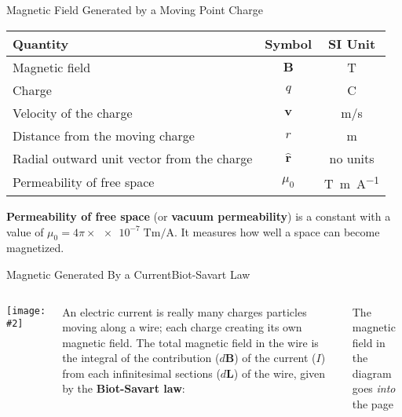 \documentclass[12pt,aspectratio=169]{beamer}
\newcommand{\pic}[2]{\texttt{[image: \#2]}}
\newcommand{\mb}[1]{\mathbf{#1}}
\newcommand{\eq}[2]{\vspace{#1}{\Large\begin{displaymath}#2\end{displaymath}}}
\begin{document}
\begin{frame}{Magnetic Field Generated by a Moving Point Charge}

  \eq{-.05in}{
    \boxed{\mb{B}=\frac{\mu_0}{4\pi}\frac{q\mb{v}\times\hat{\mb{r}}}{r^2}}
  }
  \begin{center}
    \begin{tabular}{l|c|c}
      \rowcolor{pink}
      \textbf{Quantity} & \textbf{Symbol} & \textbf{SI Unit} \\ \hline
      Magnetic field                  & $\mb{B}$ & \si{\tesla}\\
      Charge                          & $q$      & \si{\coulomb}\\
      Velocity of the charge          & $\mb{v}$ & \si{m/\second}\\
      Distance from the moving charge & $r$      & \si{\metre}\\
      Radial outward unit vector from the charge & $\hat{\mb{r}}$ & no units\\
      Permeability of free space & $\mu_0$ & \si{\tesla\metre\per\ampere}
    \end{tabular}
  \end{center}
  \textbf{Permeability of free space} (or \textbf{vacuum permeability}) is a
  constant with a value of
  $\mu_0=4\pi\times\num{e-7}\;\si{\tesla\metre\per\ampere}$. It measures how
  well a space can become magnetized.
\end{frame}



\begin{frame}{Magnetic Generated By a Current}{Biot-Savart Law}
  \begin{columns}
    \pic{1}{bsav.png}
    
    An electric current is really many charges particles moving along a wire;
    each charge creating its own magnetic field.
    The total magnetic field in the wire is the integral of the contribution
    ($d\mb{B}$) of the current ($I$) from each infinitesimal sections
    ($d\mb{L}$) of the wire, given by the \textbf{Biot-Savart law}:
  
    \eq{-.2in}{
      \boxed{d\mb{B}=\frac{\mu_0}{4\pi}\frac{Id\mb{L}\times\hat{\mb{r}}}{r^2}}
    }

    The magnetic field in the diagram goes \emph{into} the page
  \end{columns}
\end{frame}
\end{document}
